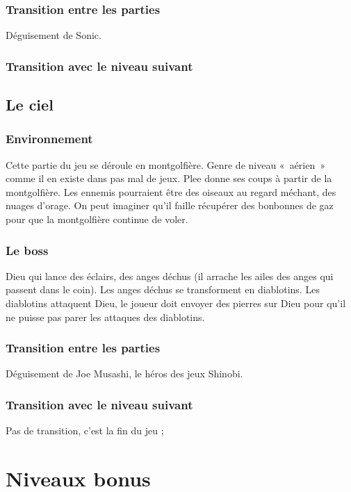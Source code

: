 \documentclass{article}
\begin{document}
\subsubsection{Transition entre les parties}
Déguisement de Sonic.

\subsubsection{Transition avec le niveau suivant}

\subsection{Le ciel}
\subsubsection{Environnement}
Cette partie du jeu se déroule en montgolfière. Genre de niveau
«~aérien~» comme il en existe dans pas mal de jeux. Plee donne ses
coups à partir de la montgolfière. Les ennemis pourraient être des
oiseaux au regard méchant, des nuages d'orage. On peut imaginer qu'il
faille récupérer des bonbonnes de gaz pour que la montgolfière
continue de voler.

\subsubsection{Le boss}
Dieu qui lance des éclairs, des anges déchus (il arrache les ailes des
anges qui passent dans le coin). Les anges déchus se transforment en
diablotins. Les diablotins attaquent Dieu, le joueur doit envoyer des
pierres sur Dieu pour qu'il ne puisse pas parer les attaques des
diablotins.

\subsubsection{Transition entre les parties}
Déguisement de Joe Musashi, le héros des jeux Shinobi.

\subsubsection{Transition avec le niveau suivant}
Pas de transition, c'est la fin du jeu ;

\section{Niveaux bonus}
\end{document}

